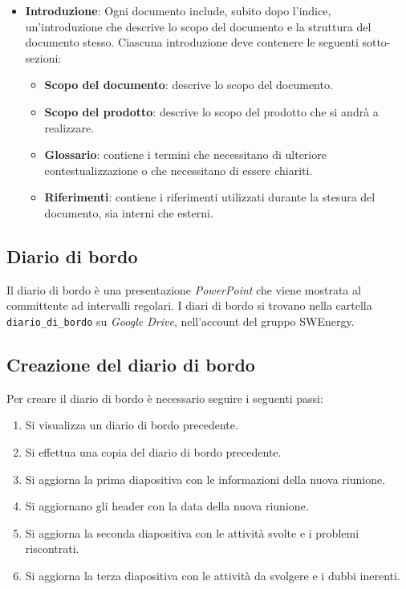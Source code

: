 \begin{itemize}
	\item \textbf{Introduzione}:
	      Ogni documento include, subito dopo l'indice, un'introduzione che
	      descrive lo scopo del documento e la struttura del documento stesso.
	      Ciascuna introduzione deve contenere le seguenti sotto-sezioni:
	      \begin{itemize}
		      \item \textbf{Scopo del documento}: descrive lo scopo del
		            documento.
		      \item \textbf{Scopo del prodotto}: descrive lo scopo del prodotto
		            che si andrà a realizzare.
		      \item \textbf{Glossario}: contiene i termini che necessitano di
		            ulteriore contestualizzazione o che necessitano di essere
		            chiariti.
		      \item \textbf{Riferimenti}: contiene i riferimenti utilizzati
		            durante la stesura del documento, sia interni che esterni.
	      \end{itemize}
\end{itemize}

\subsection{Diario di bordo}

Il diario di bordo è una presentazione \textit{PowerPoint} che viene mostrata
al committente ad intervalli regolari. I diari di bordo si trovano nella
cartella \texttt{diario\_di\_bordo} su \textit{Google Drive}, nell'account del
gruppo SWEnergy.

\subsection{Creazione del diario di bordo}

Per creare il diario di bordo è necessario seguire i seguenti passi:
\begin{enumerate}
	\item Si visualizza un diario di bordo precedente.
	\item Si effettua una copia del diario di bordo precedente.
	\item Si aggiorna la prima diapositiva con le informazioni della nuova
	      riunione.
	\item Si aggiornano gli header con la data della nuova riunione.
	\item Si aggiorna la seconda diapositiva con le attività svolte e i problemi
	      riscontrati.
	\item Si aggiorna la terza diapositiva con le attività da svolgere e i dubbi
	      inerenti.
\end{enumerate}

